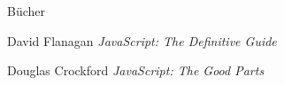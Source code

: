 \begin{frame}{Bücher}
  \begin{thebibliography}{1}
     David Flanagan
    \newblock \emph{JavaScript: The Definitive Guide}
    
     Douglas Crockford
    \newblock \emph{JavaScript: The Good Parts}
  \end{thebibliography}
\end{frame}


